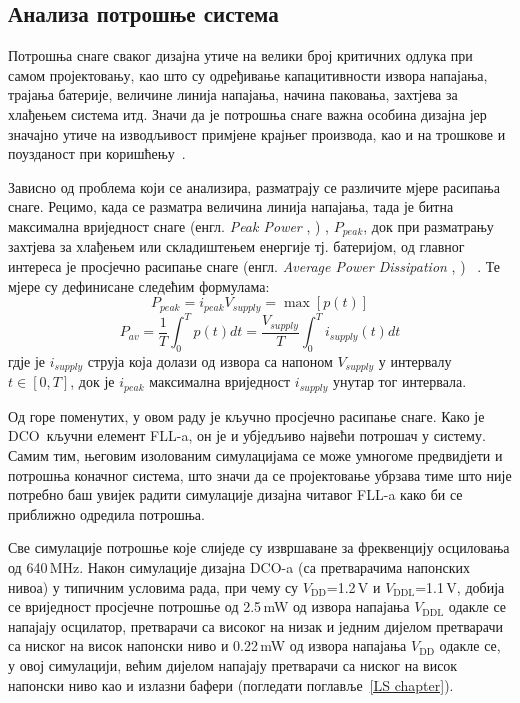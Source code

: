 \documentclass[master]{finthesis}
\makeatletter
\newcommand*{\engl}[2][\@empty]{%
    \edef\theacronym{#1}%
    (енгл. \foreignlanguage{english}{\emph{#2}%
    \ifx\theacronym\@empty \else , #1\fi})%
}
\def \FLL  {FLL} %
\def \DCO  {DCO} %
\makeatother
\begin{document}
\subsection{Анализа потрошње система} \label{section:impl:dco_pwr}
Потрошња снаге сваког дизајна утиче на велики број критичних одлука при самом пројектовању, као што су одређивање капацитивности извора напајања, трајања батерије, величине линија напајања, начина паковања, захтјева за хлађењем система итд. Значи да је потрошња снаге важна особина дизајна јер значајно утиче на изводљивост примјене крајњег производа, као и на трошкове и поузданост при коришћењу~\cite{RABAEY:2003digital}. \par
Зависно од проблема који се анализира, разматрају се различите мјере расипања снаге. Рецимо, када се разматра величина линија напајања, тада је битна максимална вриједност снаге \engl{Peak Power}, $P_{peak}$, док при разматрању захтјева за хлађењем или складиштењем енергије тј. батеријом, од главног интереса је просјечно расипање снаге \engl{Average Power Dissipation}~\cite{RABAEY:2003digital}. Те мјере су дефинисане следећим формулама:
\begin{equation}
	\label{eq:impl:dco_pwr:peak}
	P_{peak} = i_{peak}V_{supply} = \max [p(t)]
\end{equation}
\begin{equation}
	\label{eq:impl:dco_pwr:av}
	P_{av} = \frac{1}{T}\int_{0}^{T}p(t)dt = \frac{V_{supply}}{T}\int_{0}^{T}i_{supply}(t)dt
\end{equation}
гдје је $i_{supply}$ струја која долази од извора са напоном $V_{supply}$ у интервалу $t \in [0,T]$, док је $i_{peak}$ максимална вриједност $i_{supply}$ унутар тог интервала. \par
Од горе поменутих, у овом раду је кључно просјечно расипање снаге. Како је \DCO\ кључни елемент \FLL-a, он је и убједљиво највећи потрошач у систему. Самим тим, његовим изолованим симулацијама се може умногоме предвидјети и потрошња коначног система, што значи да се пројектовање убрзава тиме што није потребно баш увијек радити симулације дизајна читавог \FLL-a како би се приближно одредила потрошња. \par
Све симулације потрошње које слиједе су извршаване за фреквенцију осциловања од 640\,MHz. Након симулације дизајна \DCO-a (са претварачима напонских нивоа) у типичним условима рада, при чему су $V_\text{DD}$=1.2\,V и $V_\text{DDL}$=1.1\,V, добија се вриједност просјечне потрошње од 2.5\,mW од извора напајања $V_\text{DDL}$ одакле се напајају осцилатор, претварачи са високог на низак и једним дијелом претварачи са ниског на висок напонски ниво и 0.22\,mW од извора напајања $V_\text{DD}$ одакле се, у овој симулацији, већим дијелом напајају претварачи са ниског на висок напонски ниво као и излазни бафери (погледати поглавље~\ref{LS chapter}). \par
\end{document}
